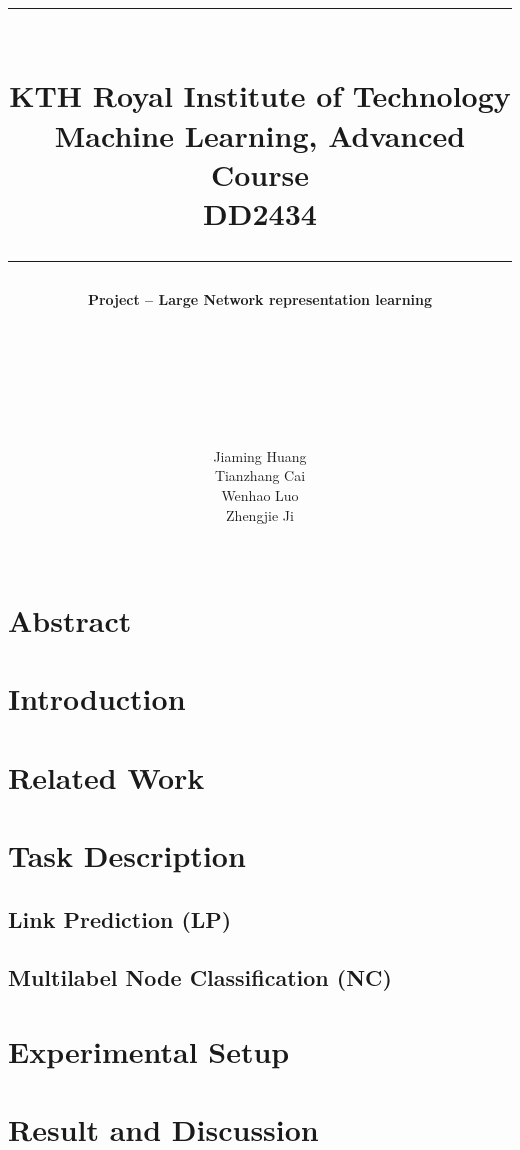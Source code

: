 \documentclass[a4paper]{article}
\title{\rule[0.5cm]{\textwidth}{0.1mm}
\\KTH Royal Institute of Technology
\\\vspace{0.5em}
Machine Learning, Advanced Course
\\\vspace{0.5em}
DD2434
\\\rule[0cm]{\textwidth}{0.1mm}\vspace{6em}}
\author
{\Large\textbf{{Project -- Large Network representation learning}}
\\\\\\\\\\\\\\\\\vspace{0.2em}
\Large{Jiaming Huang}\\\vspace{0.2em}
\Large{Tianzhang Cai}\\\vspace{0.2em}
\Large{Wenhao Luo}\\\vspace{0.2em}
\Large{Zhengjie Ji}
\\\\\vspace{3em}}
\begin{document}

\maketitle
\thispagestyle{empty}

\newpage
\tableofcontents
\thispagestyle{empty}

\newpage
\setcounter{page}{1}

\section{Abstract}

\section{Introduction}


\section{Related Work}




\section{Task Description}

\subsection{Link Prediction (LP)}

\subsection{Multilabel Node Classification (NC)}

\section{Experimental Setup}





\section{Result and Discussion}
\end{document}
